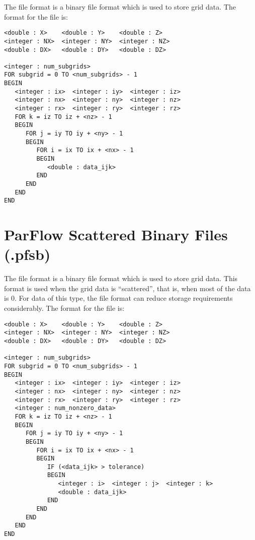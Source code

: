 The  file format is a binary file format which is used
to store \parflow{} grid data.
The format for the file is:

\begin{display}\begin{verbatim}
<double : X>    <double : Y>    <double : Z>
<integer : NX>  <integer : NY>  <integer : NZ>
<double : DX>   <double : DY>   <double : DZ>

<integer : num_subgrids>
FOR subgrid = 0 TO <num_subgrids> - 1
BEGIN
   <integer : ix>  <integer : iy>  <integer : iz>
   <integer : nx>  <integer : ny>  <integer : nz>
   <integer : rx>  <integer : ry>  <integer : rz>
   FOR k = iz TO iz + <nz> - 1
   BEGIN
      FOR j = iy TO iy + <ny> - 1
      BEGIN
         FOR i = ix TO ix + <nx> - 1
         BEGIN
            <double : data_ijk>
         END
      END
   END
END
\end{verbatim}\end{display}


\section{ParFlow Scattered Binary Files (.pfsb)}
\label{ParFlow Scattered Binary Files (.pfsb)}

The  file format is a binary file format which is used
to store \parflow{} grid data.
This format is used when the grid data is ``scattered'', that is,
when most of the data is 0.
For data of this type, the  file format can reduce
storage requirements considerably.
The format for the file is:

\begin{display}\begin{verbatim}
<double : X>    <double : Y>    <double : Z>
<integer : NX>  <integer : NY>  <integer : NZ>
<double : DX>   <double : DY>   <double : DZ>

<integer : num_subgrids>
FOR subgrid = 0 TO <num_subgrids> - 1
BEGIN
   <integer : ix>  <integer : iy>  <integer : iz>
   <integer : nx>  <integer : ny>  <integer : nz>
   <integer : rx>  <integer : ry>  <integer : rz>
   <integer : num_nonzero_data>
   FOR k = iz TO iz + <nz> - 1
   BEGIN
      FOR j = iy TO iy + <ny> - 1
      BEGIN
         FOR i = ix TO ix + <nx> - 1
         BEGIN
            IF (<data_ijk> > tolerance)
            BEGIN
               <integer : i>  <integer : j>  <integer : k>
               <double : data_ijk>
            END
         END
      END
   END
END
\end{verbatim}\end{display}

